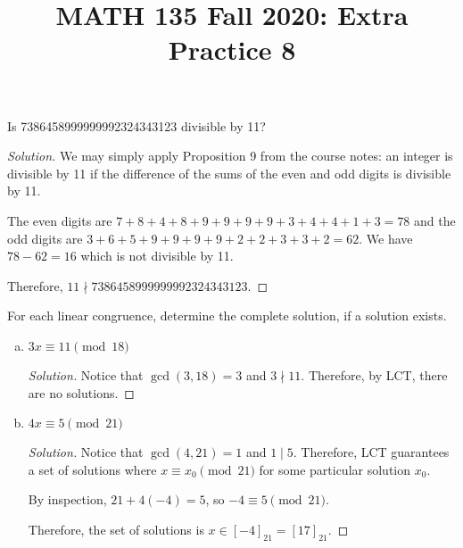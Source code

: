 
\title{MATH 135 Fall 2020: Extra Practice 8}


\thispagestyle{firstpage}

\textbf{\@title}


\question Is 7386458999999992324343123 divisible by 11?
\begin{proof}[Solution]
  We may simply apply Proposition 9 from the course notes: an integer is divisible by 11
  if the difference of the sums of the even and odd digits is divisible by 11.

  The even digits are $7+8+4+8+9+9+9+9+3+4+4+1+3 = 78$
  and the odd digits are $3+6+5+9+9+9+9+2+2+3+3+2 = 62$.
  We have $78 - 62 = 16$ which is not divisible by 11.

  Therefore, $11 \nmid 7386458999999992324343123$.
\end{proof}


\question For each linear congruence, determine the complete solution, if a solution exists.
\begin{enumerate}[(a)]
  \item $3x \equiv 11 \pmod{18}$
        \begin{proof}[Solution]
          Notice that $\gcd(3,18)=3$ and $3 \nmid 11$.
          Therefore, by LCT, there are no solutions.
        \end{proof}
  \item $4x \equiv 5 \pmod{21}$
        \begin{proof}[Solution]
          Notice that $\gcd(4,21)=1$ and $1 \mid 5$.
          Therefore, LCT guarantees a set of solutions where $x \equiv x_0 \pmod{21}$
          for some particular solution $x_0$.

          By inspection, $21+4(-4) = 5$, so $-4 \equiv 5 \pmod{21}$.

          Therefore, the set of solutions is $x \in [-4]_{21} = [17]_{21}$.
        \end{proof}
\end{enumerate}



